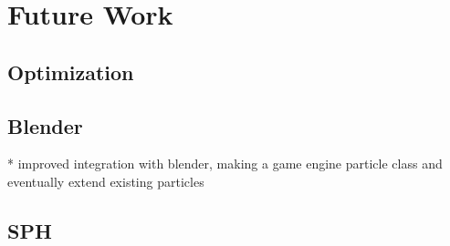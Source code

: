 \chapter{Future Work}
\section{Optimization}

\section{Blender}
* improved integration with blender, making a game engine particle class and
eventually extend existing particles


\section{SPH}

